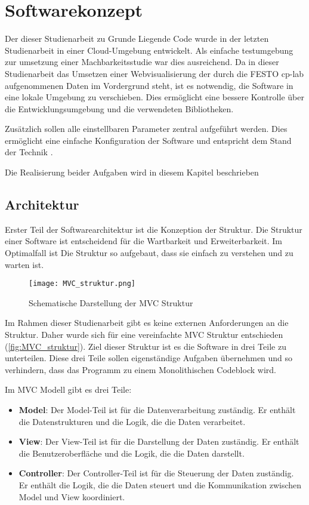 \chapter{Softwarekonzept} \label{chap:Konzept}

Der dieser Studienarbeit zu Grunde Liegende Code wurde in der letzten Studienarbeit in einer Cloud-Umgebung entwickelt. Als einfache testumgebung zur umsetzung einer Machbarkeitsstudie war dies ausreichend. 
Da in dieser Studienarbeit das Umsetzen einer Webvisualisierung der durch die FESTO \ac{cp-lab} aufgenommenen Daten im Vordergrund steht, ist es notwendig, die Software in eine lokale Umgebung zu verschieben. 
Dies ermöglicht eine bessere Kontrolle über die Entwicklungsumgebung und die verwendeten Bibliotheken. 

Zusätzlich sollen alle einstellbaren Parameter zentral aufgeführt werden. Dies ermöglicht eine einfache Konfiguration der Software und entspricht dem Stand der Technik\cite{gur_diskussion_2024} \cite{oliveira_how_2023}. 

Die Realisierung beider Aufgaben wird in diesem Kapitel beschrieben

\section{Architektur} \label{sec:architektur}

Erster Teil der Softwarearchitektur ist die Konzeption der Struktur. Die Struktur einer Software ist entscheidend für die Wartbarkeit und Erweiterbarkeit.
Im Optimalfall ist Die Struktur so aufgebaut, dass sie einfach zu verstehen und zu warten ist.

\begin{figure}[H]
    \centering
    \texttt{[image: MVC\_struktur.png]}
    \caption{Schematische Darstellung der MVC Struktur \cite{noauthor_model_2024}} 
    \label{fig:MVC_struktur}
\end{figure}

Im Rahmen dieser Studienarbeit gibt es keine externen Anforderungen an die Struktur. Daher wurde sich für eine vereinfachte \ac{MVC} Struktur entschieden (\autoref{fig:MVC_struktur}). Ziel dieser Struktur ist es die Software in drei Teile zu unterteilen.
Diese drei Teile sollen eigenständige Aufgaben übernehmen und so verhindern, dass das Programm zu einem Monolithischen Codeblock wird.

Im \ac{MVC} Modell gibt es drei Teile:
\begin{itemize}
    \item \textbf{Model}: Der Model-Teil ist für die Datenverarbeitung zuständig. Er enthält die Datenstrukturen und die Logik, die die Daten verarbeitet. 
    \item \textbf{View}: Der View-Teil ist für die Darstellung der Daten zuständig. Er enthält die Benutzeroberfläche und die Logik, die die Daten darstellt.
    \item \textbf{Controller}: Der Controller-Teil ist für die Steuerung der Daten zuständig. Er enthält die Logik, die die Daten steuert und die Kommunikation zwischen Model und View koordiniert.
\end{itemize}

